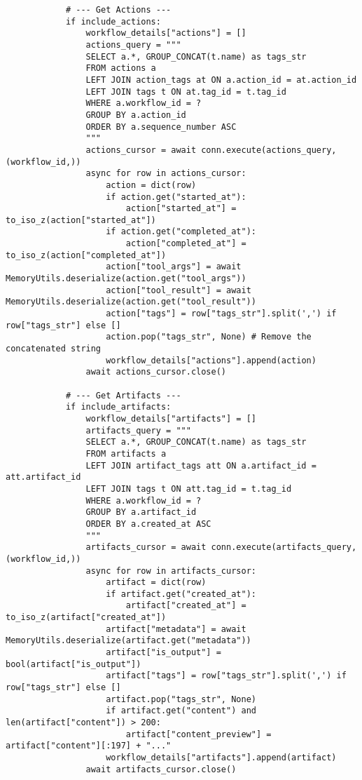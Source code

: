 \documentclass[12pt,a4paper]{article}
\begin{document}
\begin{pageablecode}
\begin{verbatim}
            # --- Get Actions ---
            if include_actions:
                workflow_details["actions"] = []
                actions_query = """
                SELECT a.*, GROUP_CONCAT(t.name) as tags_str
                FROM actions a
                LEFT JOIN action_tags at ON a.action_id = at.action_id
                LEFT JOIN tags t ON at.tag_id = t.tag_id
                WHERE a.workflow_id = ?
                GROUP BY a.action_id
                ORDER BY a.sequence_number ASC
                """
                actions_cursor = await conn.execute(actions_query, (workflow_id,))
                async for row in actions_cursor:
                    action = dict(row)
                    if action.get("started_at"):
                        action["started_at"] = to_iso_z(action["started_at"])
                    if action.get("completed_at"):
                        action["completed_at"] = to_iso_z(action["completed_at"])
                    action["tool_args"] = await MemoryUtils.deserialize(action.get("tool_args"))
                    action["tool_result"] = await MemoryUtils.deserialize(action.get("tool_result"))
                    action["tags"] = row["tags_str"].split(',') if row["tags_str"] else []
                    action.pop("tags_str", None) # Remove the concatenated string
                    workflow_details["actions"].append(action)
                await actions_cursor.close()

            # --- Get Artifacts ---
            if include_artifacts:
                workflow_details["artifacts"] = []
                artifacts_query = """
                SELECT a.*, GROUP_CONCAT(t.name) as tags_str
                FROM artifacts a
                LEFT JOIN artifact_tags att ON a.artifact_id = att.artifact_id
                LEFT JOIN tags t ON att.tag_id = t.tag_id
                WHERE a.workflow_id = ?
                GROUP BY a.artifact_id
                ORDER BY a.created_at ASC
                """
                artifacts_cursor = await conn.execute(artifacts_query, (workflow_id,))
                async for row in artifacts_cursor:
                    artifact = dict(row)
                    if artifact.get("created_at"):
                        artifact["created_at"] = to_iso_z(artifact["created_at"])
                    artifact["metadata"] = await MemoryUtils.deserialize(artifact.get("metadata"))
                    artifact["is_output"] = bool(artifact["is_output"])
                    artifact["tags"] = row["tags_str"].split(',') if row["tags_str"] else []
                    artifact.pop("tags_str", None)
                    if artifact.get("content") and len(artifact["content"]) > 200:
                        artifact["content_preview"] = artifact["content"][:197] + "..."
                    workflow_details["artifacts"].append(artifact)
                await artifacts_cursor.close()


\end{verbatim}
\end{pageablecode}
\end{document}
